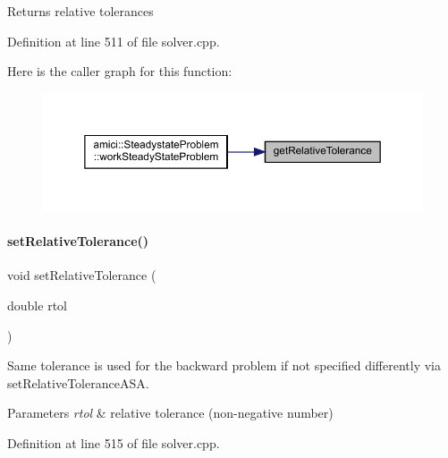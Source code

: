 \begin{DoxyReturn}{Returns}
relative tolerances 
\end{DoxyReturn}


Definition at line 511 of file solver.\+cpp.

Here is the caller graph for this function\+:
\nopagebreak
\begin{figure}[H]
\begin{center}
\leavevmode
\includegraphics[width=350pt]{classamici_1_1_solver_a54fe1b062315ed19b2dbf88206415e06_icgraph}
\end{center}
\end{figure}
\mbox{\label{classamici_1_1_solver_afb5f0c48f24e4bc3efad8ef599adde56}} 
\paragraph{\texorpdfstring{setRelativeTolerance()}{setRelativeTolerance()}}
{\footnotesize\ttfamily void set\+Relative\+Tolerance (\begin{DoxyParamCaption}\item[{double}]{rtol }\end{DoxyParamCaption})}

Same tolerance is used for the backward problem if not specified differently via set\+Relative\+Tolerance\+A\+SA.


\begin{DoxyParams}{Parameters}
{\em rtol} & relative tolerance (non-\/negative number) \\
\hline
\end{DoxyParams}


Definition at line 515 of file solver.\+cpp.

